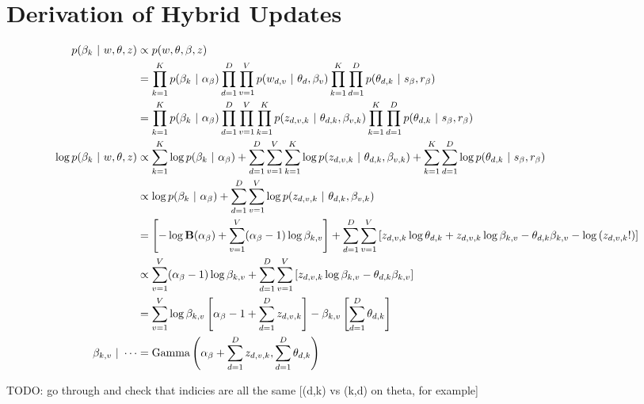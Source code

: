 \documentclass[11pt,letterpaper]{article}
\begin{document}
\section{Derivation of Hybrid Updates}
\begin{align}
p(\beta_k ~\vert~ w, \theta, z) &\propto  p(w, \theta, \beta, z) \\
&= \prod_{k=1}^K p(\beta_k ~\vert~ \alpha_\beta) \prod_{d=1}^D\prod_{v=1}^V p(w_{d,v} ~\vert~ \theta_d, \beta_v)  \prod_{k=1}^K \prod_{d=1}^D p(\theta_{d,k} ~\vert~ s_\beta, r_\beta) \\
&= \prod_{k=1}^K p(\beta_k ~\vert~ \alpha_\beta) \prod_{d=1}^D\prod_{v=1}^V \prod_{k=1}^K p(z_{d,v,k} ~\vert~ \theta_{d,k}, \beta_{v,k})  \prod_{k=1}^K \prod_{d=1}^D p(\theta_{d,k} ~\vert~ s_\beta, r_\beta) \\
\log p(\beta_k ~\vert~ w, \theta, z) &\propto \sum_{k=1}^K \log p(\beta_k ~\vert~ \alpha_\beta) + \sum_{d=1}^D\sum_{v=1}^V \sum_{k=1}^K \log p(z_{d,v,k} ~\vert~ \theta_{d,k}, \beta_{v,k}) + \sum_{k=1}^K \sum_{d=1}^D \log p(\theta_{d,k} ~\vert~ s_\beta, r_\beta) \\
&\propto \log p(\beta_k ~\vert~ \alpha_\beta) + \sum_{d=1}^D\sum_{v=1}^V \log p(z_{d,v,k} ~\vert~ \theta_{d,k}, \beta_{v,k}) \\
&= \left[ - \log\mathbf{B}(\alpha_\beta) + \sum_{v=1}^V (\alpha_\beta -1)\log \beta_{k,v}\right] + \sum_{d=1}^D\sum_{v=1}^V \left[ z_{d,v,k} \log\theta_{d,k} + z_{d,v,k} \log\beta_{k,v} - \theta_{d,k}\beta_{k,v} - \log\left(z_{d,v,k}!\right)\right] \\
&\propto \sum_{v=1}^V (\alpha_\beta -1)\log \beta_{k,v} + \sum_{d=1}^D\sum_{v=1}^V \left[ z_{d,v,k} \log\beta_{k,v} - \theta_{d,k}\beta_{k,v} \right] \\
&= \sum_{v=1}^V \log \beta_{k,v} \left[ \alpha_\beta - 1 + \sum_{d=1}^D z_{d,v,k}\right] - \beta_{k,v} \left[\sum_{d=1}^D\theta_{d,k}\right] \\
\beta_{k,v} ~\vert~ \cdots &= \mbox{Gamma}\left(\alpha_\beta + \sum_{d=1}^D z_{d,v,k}, \sum_{d=1}^D\theta_{d,k}\right)
\end{align}


TODO: go through and check that indicies are all the same [(d,k) vs (k,d) on theta, for example]


%
%
\end{document}
